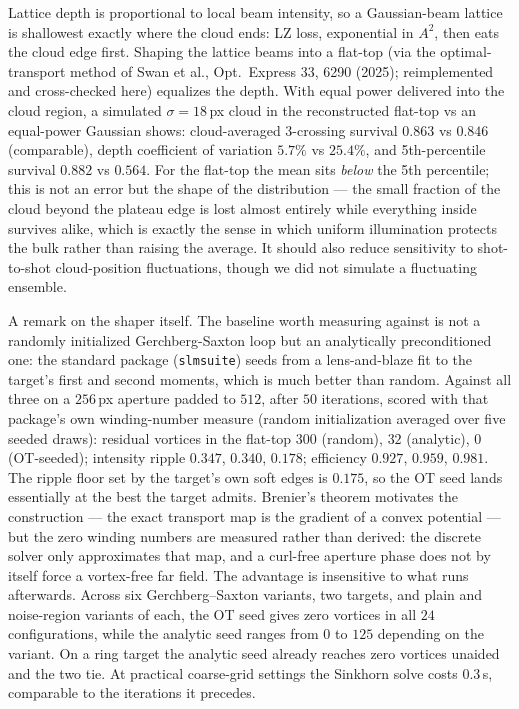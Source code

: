 \documentclass[aps,prb,floatfix,amsmath,amssymb,groupedaddress]{revtex4}
\begin{document}
Lattice depth is proportional to local beam intensity, so a Gaussian-beam
lattice is shallowest exactly where the cloud ends: LZ loss, exponential in
$A^2$, then eats the cloud edge first. Shaping the lattice beams into a
flat-top (via the optimal-transport method of Swan et al., Opt.\ Express 33,
6290 (2025); reimplemented and cross-checked here) equalizes the depth. With
equal power delivered into the cloud region, a simulated $\sigma = 18\,$px
cloud in the reconstructed flat-top vs an equal-power Gaussian shows:
cloud-averaged 3-crossing survival $0.863$ vs $0.846$ (comparable), depth
coefficient of variation $5.7\%$ vs $25.4\%$, and 5th-percentile survival
$0.882$ vs $0.564$. For the flat-top the mean sits \emph{below} the 5th
percentile; this is not an error but the shape of the distribution --- the
small fraction of the cloud beyond the plateau edge is lost almost entirely
while everything inside survives alike, which is exactly the sense in which
uniform illumination protects the bulk rather than raising the average. It
should also reduce sensitivity to shot-to-shot cloud-position fluctuations,
though we did not simulate a fluctuating ensemble.

A remark on the shaper itself. The baseline worth measuring against is not a
randomly initialized Gerchberg-Saxton loop but an analytically preconditioned
one: the standard package (\texttt{slmsuite}) seeds from a lens-and-blaze fit
to the target's first and second moments, which is much better than random.
Against all three on a $256\,$px aperture padded to $512$, after $50$
iterations, scored with that package's own winding-number measure (random
initialization averaged over five seeded draws): residual vortices in the
flat-top $300$ (random), $32$ (analytic), $0$ (OT-seeded); intensity ripple
$0.347$, $0.340$, $0.178$; efficiency $0.927$, $0.959$, $0.981$. The ripple
floor set by the target's own soft edges is $0.175$, so the OT seed lands
essentially at the best the target admits. Brenier's theorem motivates the
construction --- the exact transport map is the gradient of a convex potential
--- but the zero winding numbers are measured rather than derived: the discrete
solver only approximates that map, and a curl-free aperture phase does not by
itself force a vortex-free far field. The advantage is insensitive to what runs
afterwards. Across six Gerchberg--Saxton variants, two targets, and plain and
noise-region variants of each, the OT seed gives zero vortices in all $24$
configurations, while the analytic seed ranges from $0$ to $125$ depending on
the variant. On a ring target the analytic seed already reaches zero vortices
unaided and the two tie. At practical coarse-grid settings the Sinkhorn solve
costs $0.3\,$s, comparable to the iterations it precedes.
\end{document}
